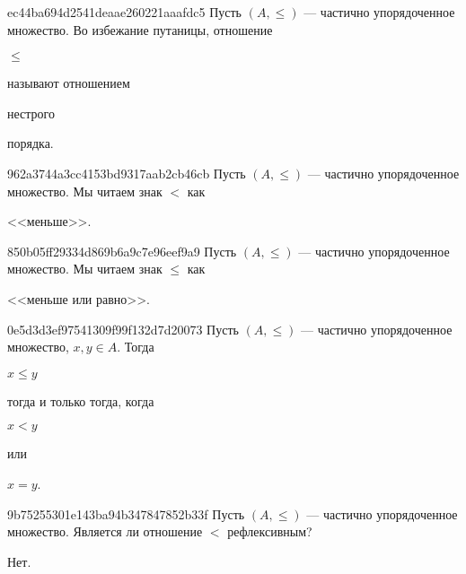 \begin{note}{ec44ba694d2541deaae260221aaafdc5}
    Пусть \({ (A, \leqslant) }\) --- частично упорядоченное множество.
    Во избежание путаницы, отношение \begin{icloze}{2}\({ \leqslant }\)\end{icloze} называют отношением \begin{icloze}{1}нестрого\end{icloze} порядка.
\end{note}

\begin{note}{962a3744a3cc4153bd9317aab2cb46cb}
    Пусть \({ (A, \leqslant) }\) --- частично упорядоченное множество.
    Мы читаем знак \({ < }\) как \begin{icloze}{1}<<меньше>>.\end{icloze}
\end{note}

\begin{note}{850b05ff29334d869b6a9c7e96eef9a9}
    Пусть \({ (A, \leqslant) }\) --- частично упорядоченное множество.
    Мы читаем знак \({ \leqslant }\) как \begin{icloze}{1}<<меньше или равно>>.\end{icloze}
\end{note}

\begin{note}{0e5d3d3ef97541309f99f132d7d20073}
    Пусть \({ (A, \leqslant) }\) --- частично упорядоченное множество, \({ x, y \in A }\).
    Тогда \begin{icloze}{2}\({ x \leqslant y }\)\end{icloze} \begin{icloze}{3}тогда и только тогда, когда\end{icloze} \begin{icloze}{1}\({ x < y }\)\end{icloze} или \begin{icloze}{1}\({ x = y }\).\end{icloze}
\end{note}

\begin{note}{9b75255301e143ba94b347847852b33f}
    Пусть \({ (A, \leqslant) }\) --- частично упорядоченное множество.
    Является ли отношение \({ < }\) рефлексивным?

    \begin{cloze}{1}
        Нет.
    \end{cloze}
\end{note}

